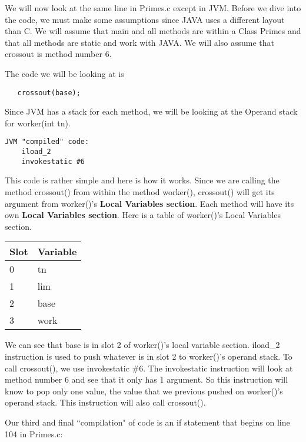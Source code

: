 \documentclass[11pt]{article}
\begin{document}

We will now look at the same line in Primes.c except in JVM. Before we dive into the code, we must make some assumptions since JAVA uses a different layout than C. We will assume that main and all methods are within a Class Primes and that all methods are static and work with JAVA. We will also assume that crossout is method number 6.

The code we will be looking at is 
\begin{verbatim}
   crossout(base);
\end{verbatim}

Since JVM has a stack for each method, we will be looking at the Operand stack for worker(int tn).

\begin{verbatim}
JVM "compiled" code:
    iload_2
    invokestatic #6
\end{verbatim}

This code is rather simple and here is how it works. Since we are calling the method crossout() from within the method worker(), crossout() will get its argument from worker()'s {\bf Local Variables section}. Each method will have its own {\bf Local Variables section}. Here is a table of worker()'s Local Variables section.

\begin{table}[h]
    \begin{tabular}{|l|l|}
        \hline
        Slot & Variable \\ \hline
        0    & tn       \\ 
        1    & lim      \\ 
        2    & base     \\ 
        3    & work     \\
        \hline
    \end{tabular}
\end{table}

We can see that base is in slot 2 of worker()'s local variable section. iload\_2 instruction is used to push whatever is in slot 2 to worker()'s operand stack. To call crossout(), we use invokestatic \#6. The invokestatic instruction will look at method number 6 and see that it only has 1 argument. So this instruction will know to pop only one value, the value that we previous pushed on worker()'s operand stack. This instruction will also call crossout().




Our third and final ``compilation" of code is an if statement that begins on line 104 in Primes.c:
\end{document}
